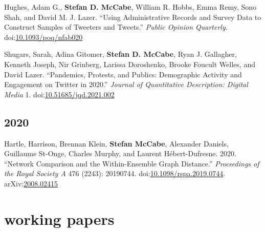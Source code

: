 \documentclass[11pt, letter]{article}
\begin{document}
\begin{hangparas}{.25in}{1}
  Hughes, Adam G.,\textsuperscript{\textdagger} \textbf{Stefan D.
    McCabe},\textsuperscript{\textdagger} William R. Hobbs, Emma Remy, Sono
  Shah, and David M. J. Lazer. ``Using Administrative Records and Survey Data to
  Construct Samples of Tweeters and Tweets.'' \textit{Public Opinion Quarterly}.
  doi:\href{https://doi.org/10.1093/poq/nfab020}{10.1093/poq/nfab020}
  \vspace{2mm}

Shugars, Sarah, Adina Gitomer, \textbf{Stefan D. McCabe}, Ryan J. Gallagher,
Kenneth Joseph, Nir Grinberg, Larissa Doroshenko, Brooke Foucult Welles, and
David Lazer. ``Pandemics, Protests, and Publics: Demographic Activity and
Engagement on Twitter in 2020.'' \textit{Journal of Quantitative Description:
  Digital Media} 1.
doi:\href{https://doi.org/10.51685/jqd.2021.002}{10.51685/jqd.2021.002}

\end{hangparas}
\subsection{2020}

\begin{hangparas}{.25in}{1}
  Hartle, Harrison, Brennan Klein, \textbf{Stefan McCabe}, Alexander Daniels,
  Guillaume St-Onge, Charles Murphy, and Laurent Hébert-Dufresne. 2020.
  ``Network Comparison and the Within-Ensemble Graph Distance.''
  \textit{Proceedings of the Royal Society A} 476 (2243): 20190744.
  doi:\href{https://doi.org/10.1098/rspa.2019.0744}{10.1098/rspa.2019.0744}.
  arXiv:\href{https://arxiv.org/abs/2008.02415}{2008.02415} \vspace{2mm}

\end{hangparas}
\section{working papers}
\end{document}
